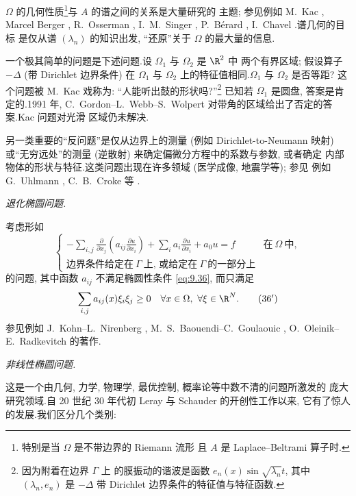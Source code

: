 $\Omega$ 的几何性质\footnote{特别是当 $\Omega$ 是不带边界的 Riemann 流形
且 $A$ 是 Laplace--Beltrami 算子时.}与 $A$ 的谱之间的关系是大量研究的
主题; 参见例如 M.~Kac , Marcel Berger ,
R.~Osserman , I.~M.~Singer ,
P.~B\'erard , I.~Chavel .谱几何的目标
是仅从谱 $(\lambda_n)$ 的知识出发, ``还原''关于 $\Omega$ 的最大量的信息.

一个极其简单的问题是下述问题.设 $\Omega_1$ 与 $\Omega_2$ 是 $\R^2$ 中
两个有界区域; 假设算子 $-\Delta$ (带 Dirichlet 边界条件) 在 $\Omega_1$ 与
$\Omega_2$ 上的特征值相同.$\Omega_1$ 与 $\Omega_2$ 是否等距? 这个问题被
M.~Kac 戏称为: ``人能听出鼓的形状吗?''\footnote{因为附着在边界 $\Gamma$ 上
的膜振动的谐波是函数 $e_n(x)\sin\sqrt{\lambda_n}t$, 其中 $(\lambda_n,e_n)$
是 $-\Delta$ 带 Dirichlet 边界条件的特征值与特征函数.} 已知若 $\Omega_1$
是圆盘, 答案是肯定的.1991 年, C.~Gordon--L.~Webb--S.~Wolpert
 对带角的区域给出了否定的答案.Kac 问题对光滑
区域仍未解决.

另一类重要的``反问题''是仅从边界上的测量 (例如 Dirichlet-to-Neumann 映射)
或``无穷远处''的测量 (逆散射) 来确定偏微分方程中的系数与参数, 或者确定
内部物体的形状与特征.这类问题出现在许多领域 (医学成像, 地震学等); 参见
例如 G.~Uhlmann , C.~B.~Croke 等 .

 \emph{退化椭圆问题.}

考虑形如
\begin{equation*}
\begin{cases}
\displaystyle-\sum_{i,j}\frac{\partial}{\partial x_j}
\left(a_{ij}\frac{\partial u}{\partial x_i}\right)
+\sum_ia_i\frac{\partial u}{\partial x_i}+a_0u=f
& \text{在}\ \Omega\ \text{中},\\[2mm]
\text{边界条件给定在}\ \Gamma\ \text{上, 或给定在}\ \Gamma\ \text{的一部分上}
\end{cases}
\end{equation*}
的问题, 其中函数 $a_{ij}$ 不满足椭圆性条件 \eqref{eq:9.36}, 而只满足
\begin{equation}
\sum_{i,j}a_{ij}(x)\xi_i\xi_j\ge0\quad\forall x\in\Omega,\ \forall\xi\in\R^N.
\tag*{(36$'$)}
\end{equation}
参见例如 J.~Kohn--L.~Nirenberg ,
M.~S.~Baouendi--C.~Goulaouic ,
O.~Oleinik--E.~Radkevitch  的著作.

 \emph{非线性椭圆问题.}

这是一个由几何, 力学, 物理学, 最优控制, 概率论等中数不清的问题所激发的
庞大研究领域.自 20 世纪 30 年代初 Leray 与 Schauder 的开创性工作以来,
它有了惊人的发展.我们区分几个类别:

